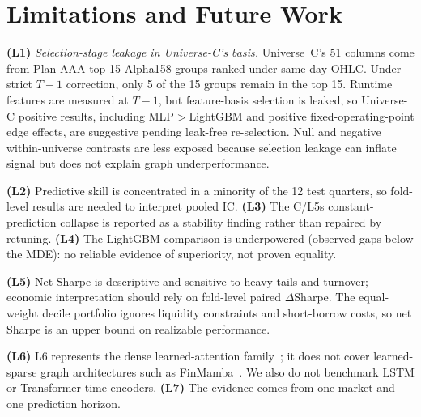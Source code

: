 \documentclass[sigconf,nonacm]{acmart}
\begin{document}
\section{Limitations and Future Work}\label{sec:limits}
\textbf{(L1)} \emph{Selection-stage leakage in Universe-C's basis.} Universe~C's 51 columns come from Plan-AAA top-15 Alpha158 groups ranked under same-day OHLC. Under strict $T-1$ correction, only 5 of the 15 groups remain in the top 15. Runtime features are measured at $T-1$, but feature-basis selection is leaked, so Universe-C positive results, including MLP${}>{}$LightGBM and positive fixed-operating-point edge effects, are suggestive pending leak-free re-selection. Null and negative within-universe contrasts are less exposed because selection leakage can inflate signal but does not explain graph underperformance.

\textbf{(L2)} Predictive skill is concentrated in a minority of the 12 test quarters, so fold-level results are needed to interpret pooled IC. \textbf{(L3)} The C/L5s constant-prediction collapse is reported as a stability finding rather than repaired by retuning. \textbf{(L4)} The LightGBM comparison is underpowered (observed gaps below the MDE): no reliable evidence of superiority, not proven equality.

\textbf{(L5)} Net Sharpe is descriptive and sensitive to heavy tails and turnover; economic interpretation should rely on fold-level paired $\Delta$Sharpe. The equal-weight decile portfolio ignores liquidity constraints and short-borrow costs, so net Sharpe is an upper bound on realizable performance.

\textbf{(L6)} L6 represents the dense learned-attention family~\cite{li2024master,cheng2021adgat}; it does not cover learned-sparse graph architectures such as FinMamba~\cite{finmamba2025}. We also do not benchmark LSTM or Transformer time encoders. \textbf{(L7)} The evidence comes from one market and one prediction horizon.
\end{document}
